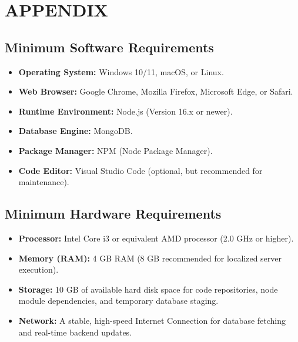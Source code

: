 \chapter{APPENDIX}

\section{Minimum Software Requirements}

\begin{itemize}
    \item \textbf{Operating System:} Windows 10/11, macOS, or Linux.
    \item \textbf{Web Browser:} Google Chrome, Mozilla Firefox, Microsoft Edge, or Safari.
    \item \textbf{Runtime Environment:} Node.js (Version 16.x or newer).
    \item \textbf{Database Engine:} MongoDB.
    \item \textbf{Package Manager:} NPM (Node Package Manager).
    \item \textbf{Code Editor:} Visual Studio Code (optional, but recommended for maintenance).
\end{itemize}

\section{Minimum Hardware Requirements}

\begin{itemize}
    \item \textbf{Processor:} Intel Core i3 or equivalent AMD processor (2.0 GHz or higher).
    \item \textbf{Memory (RAM):} 4 GB RAM (8 GB recommended for localized server execution).
    \item \textbf{Storage:} 10 GB of available hard disk space for code repositories, node module dependencies, and temporary database staging.
    \item \textbf{Network:} A stable, high-speed Internet Connection for database fetching and real-time backend updates.
\end{itemize}
